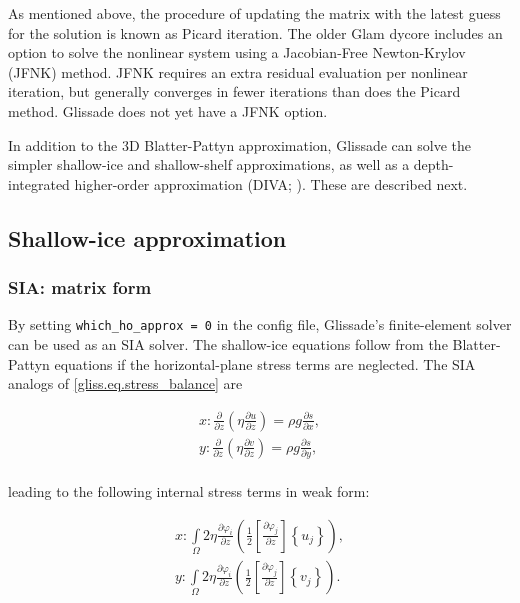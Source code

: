 {As mentioned above, the procedure of updating the matrix with the latest guess for the solution
is known as Picard iteration.  The older Glam dycore includes an option
to solve the nonlinear system using a Jacobian-Free Newton-Krylov (JFNK) method.
JFNK requires an extra residual evaluation per nonlinear iteration, but generally
converges in fewer iterations than does the Picard method.  Glissade does not yet
have a JFNK option.

In addition to the 3D Blatter-Pattyn approximation, Glissade can solve the simpler shallow-ice
and shallow-shelf approximations, as well as a depth-integrated higher-order approximation
(DIVA; \citet{Goldberg2011}). These are described next.

\subsection{Shallow-ice approximation}
\label{sc:glissade-sia}

\subsubsection{SIA: matrix form}

By setting \texttt{which\_ho\_approx = 0} in the config file, Glissade's finite-element solver can be used as an
SIA solver. The shallow-ice equations follow from the Blatter-Pattyn equations if the horizontal-plane stress
terms are neglected.  The SIA analogs of \eqref{gliss.eq.stress_balance} are

\begin{equation}
  \label{gliss.eq.stress_balance_sia}
  \begin{split}
    x: \frac{\partial }{\partial z}\left( \eta \frac{\partial u}{\partial z} \right) = \rho g\frac{\partial s}{\partial x}, \\
    y: \frac{\partial }{\partial z}\left( \eta \frac{\partial v}{\partial z} \right) = \rho g\frac{\partial s}{\partial y}, \\
  \end{split}
\end{equation}

\noindent
leading to the following internal stress terms in weak form:

\begin{equation}
  \label{gliss.eq.element_matrix_sia}
  \begin{split}
    x: \int\limits_{\Omega } {2 \eta \frac{\partial {{\varphi }_{i}}}{\partial z}\left( \frac{1}{2}\left[ \frac{\partial {{\varphi }_{j}}}{\partial z} \right]\left\{ {{u}_{j}} \right\} \right) },  \\
    y: \int\limits_{\Omega } {2 \eta \frac{\partial {{\varphi }_{i}}}{\partial z}\left( \frac{1}{2}\left[ \frac{\partial {{\varphi }_{j}}}{\partial z} \right]\left\{ {{v}_{j}} \right\} \right) }.  \\
  \end{split}
\end{equation}

}
